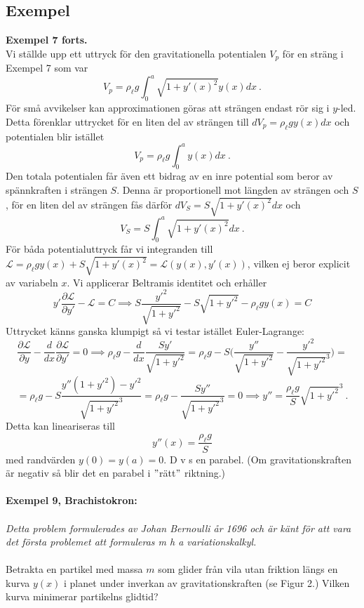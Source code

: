 \documentclass{article}
\begin{document}
\subsection{Exempel}
\textbf{Exempel 7 forts.}\\
Vi ställde upp ett uttryck för den gravitationella potentialen $V_p$ för en sträng i Exempel 7 som var
$$
V_p=\rho_{\ell}g\int_0^a\sqrt{1+y'(x)^2}y(x)dx \ .
$$
För små avvikelser kan approximationen göras att strängen endast rör sig i $y$-led. Detta förenklar uttrycket för en liten del av strängen till $dV_p=\rho_{\ell}gy(x)dx$ och potentialen blir istället
$$
V_p=\rho_{\ell}g\int_0^ay(x)dx \ .
$$
Den totala potentialen får även ett bidrag av en inre potential som beror av spännkraften i strängen $S$. Denna är proportionell mot längden av strängen och $S$, för en liten del av strängen fås därför $dV_S=S\sqrt{1+y'(x)^2}dx$
och
$$
V_S=S\int_0^a\sqrt{1+y'(x)^2}dx \ .
$$
För båda potentialuttryck får vi integranden till $\mathcal{L}=\rho_{\ell}gy(x)+S\sqrt{1+y'(x)^2}=\mathcal{L}(y(x),y'(x))$, vilken ej beror explicit av variabeln $x$. Vi applicerar Beltramis identitet och erhåller
$$
y'\frac{\partial\mathcal{L}}{\partial y'}-\mathcal{L}=C\implies S\frac{y'^2}{\sqrt{1+y'^2}}-S\sqrt{1+y'^2}-\rho_{\ell}gy(x)=C
$$
Uttrycket känns ganska klumpigt så vi testar istället Euler-Lagrange:
$$
\frac{\partial\mathcal{L}}{\partial y}-\frac{d}{dx}\frac{\partial\mathcal{L}}{\partial y'}=0\implies\rho_{\ell}g-\frac{d}{dx}\frac{Sy'}{\sqrt{1+y'^2}}=\rho_{\ell}g-S\Big(\frac{y''}{\sqrt{1+y'^2}}-\frac{y'^2}{\sqrt{1+y'^2}^3}\Big)=
$$
$$
=\rho_{\ell}g-S\frac{y''(1+y'^2)-y'^2}{\sqrt{1+y'^2}^3}=\rho_{\ell}g-\frac{Sy''}{\sqrt{1+y'^2}^3}=0 \implies y''= \frac{\rho_{\ell}g}{S}\sqrt{1+y'^2}^3 \ .
$$
Detta kan lineariseras till
$$
y''(x)=\frac{\rho_{\ell}g}{S}
$$
med randvärden $y(0)=y(a)=0$. D v s en parabel. (Om gravitationskraften är negativ så blir det en parabel i $"$rätt$"$ riktning.)\\ \\
\textbf{Exempel 9, Brachistokron:}\\ \\
\textit{Detta problem formulerades av Johan Bernoulli år 1696 och är känt för att vara det första problemet att formuleras m h a variationskalkyl.}\\ \\
Betrakta en partikel med massa $m$ som glider från vila utan friktion längs en kurva $y(x)$ i planet under inverkan av gravitationskraften (se Figur 2.) Vilken kurva minimerar partikelns glidtid?\\
\end{document}
